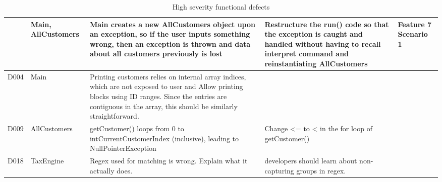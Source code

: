 \begin{table}[H]
\begin{tabularx}{\textwidth}{| c | P | X | X | P |}
& Main, AllCustomers 
& Main creates a new AllCustomers object upon an exception, so if the user inputs something wrong, then an exception is thrown and data about all customers previously is lost 
& Restructure the run() code so that the exception is caught and handled without having to recall interpret command and reinstantiating AllCustomers 
& Feature 7 Scenario 1 \\
\hline %
D004 
& Main 
& Printing customers relies on internal array indices, which are not exposed to user and Allow printing blocks using ID ranges. Since the entries are contiguous in the array, this should be similarly straightforward. 
& 
& \\
\hline %
D009 
& AllCustomers 
& getCustomer() loops from 0 to intCurrentCustomerIndex (inclusive), leading to NullPointerException
& Change <= to < in the for loop of getCustomer() 
& \\
\hline %
D018 
& TaxEngine 
& Regex used for matching is wrong. Explain what it actually does. 
&  developers should learn about non-capturing groups in regex. 
& \\
\hline %
\end{tabularx}
\caption{High severity functional defects}
\end{table}

